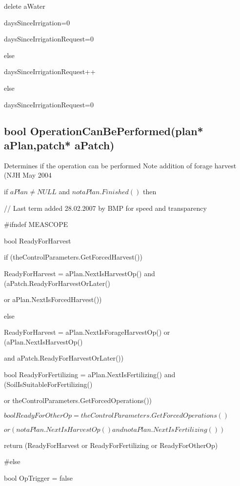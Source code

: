 \documentclass[%
]{scrartcl}
\begin{document}
{	\quad \quad 		delete aWater
	
	\quad \quad       daysSinceIrrigation=0

 \quad  \quad        daysSinceIrrigationRequest=0
      
      
   \quad    else
   
   \quad   \quad  	daysSinceIrrigationRequest++
	
   else
   
   \quad 	daysSinceIrrigationRequest=0



\subsection{bool OperationCanBePerformed(plan* aPlan,patch* aPatch)}
Determines if the operation can be performed
Note addition of forage harvest (NJH May 2004


   if $aPlan \ne NULL$ and  $not aPlan.Finished()$ then
   
    \quad	 // Last term added 28.02.2007 by BMP for speed and transparency
   
	{
\#ifndef MEASCOPE

    	bool ReadyForHarvest
    	
      if (theControlParameters.GetForcedHarvest())

      	ReadyForHarvest = aPlan.NextIsHarvestOp() and (aPatch.ReadyForHarvestOrLater()  

  \quad     or  aPlan.NextIsForcedHarvest())
      
      else

      	ReadyForHarvest = aPlan.NextIsForageHarvestOp()  or  (aPlan.NextIsHarvestOp() 

        \quad          and aPatch.ReadyForHarvestOrLater())
      	
      bool ReadyForFertilizing = aPlan.NextIsFertilizing() and (SoilIsSuitableForFertilizing()   

\quad     or  theControlParameters.GetForcedOperations())
      
     $ bool ReadyForOtherOp = theControlParameters.GetForcedOperations() $ 

$or  ( not aPlan.NextIsHarvestOp() and  not aPlan.NextIsFertilizing())$


   	return (ReadyForHarvest  or  ReadyForFertilizing or  ReadyForOtherOp)
   	
\#else
     
      bool OpTrigger = false
      
}}
\end{document}
